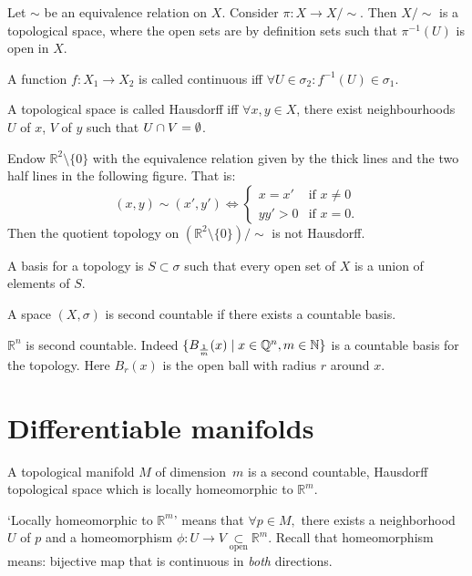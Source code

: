 \begin{definition}
    Let $\sim $ be an equivalence relation on $X$.
    Consider $\pi: X \to  X / \sim $.
    Then $X / \sim $ is a topological space, where the open sets are by definition sets such that $\pi^{-1}(U)$ is open in $X$.
\end{definition}
\begin{definition}
    A function $f: X_1 \to  X_2$ is called continuous iff $\forall  U \in \sigma_2: f ^{-1}(U) \in \sigma_1$.
\end{definition}
\begin{definition}
    A topological space is called Hausdorff iff
    $\forall x, y \in X$, there exist neighbourhoods $U$ of $x$, $V$ of $y$ such that $U \cap V = \emptyset$.
\end{definition}
\begin{eg}
 Endow $\mathbb R^2 \setminus \{0\}$   with the equivalence relation given by the thick lines and the two half lines in the following figure. That is:
    \[
        (x, y) \sim (x', y') \iff \begin{cases}
            x = x' & \text{if $x \neq 0$}\\
            y y' > 0 & \text{if $x = 0$.}
        \end{cases}
    \] 
  Then the quotient topology on $(\mathbb R^2 \setminus \{0\}) / \sim $ is not Hausdorff.
\end{eg}

\begin{definition}
    A basis for a topology is $S \subset \sigma$ such that every open set of $X$ is a union of elements of $S$.
\end{definition}

\begin{definition}[C2]
    A space $(X, \sigma)$ is second countable if there exists a countable basis.
\end{definition}
\begin{eg}
    $\mathbb R^{n}$ is second countable. 
   Indeed $\{ B_{\frac{1}{m}}(x)  \mid  x \in \mathbb Q^{n}, m \in \mathbb{N}\} $ is a countable basis for the topology. Here $B_{r}(x)$ is the open ball with radius $r$ around $x$.
\end{eg}
\section{Differentiable manifolds}
\begin{definition}
    A topological manifold $M$ of dimension~$m$ is a second countable, Hausdorff topological space which is locally homeomorphic to $\mathbb R^{m}$.
\end{definition}
\begin{remark}
`Locally homeomorphic to $\mathbb R^{m}$' means that $\forall p \in M, $ there exists a neighborhood $U$ of $p$ and a homeomorphism $\phi: U \to  V \underset{\text{open}}{\subset} \mathbb R^{m}$. Recall that homeomorphism means: bijective map that is continuous in \emph{both} directions.   
\end{remark}

